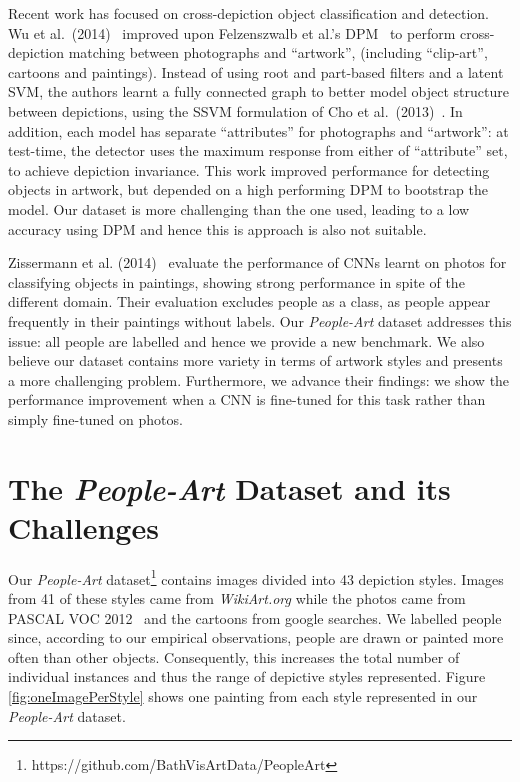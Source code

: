 \documentclass[runningheads]{llncs}
\begin{document}
Recent work has focused on cross-depiction object classification and detection.
Wu et al.\ (2014)~\cite{wu2014learning} improved upon Felzenszwalb et al.'s \ac{DPM}~\cite{felzenszwalb2010object} to perform cross-depiction matching between photographs and ``artwork'', (including ``clip-art'', cartoons and paintings).
Instead of using root and part-based filters and a latent \ac{SVM}, the authors learnt a fully connected graph to better model object structure between depictions, using the \ac{SSVM} formulation of Cho et al.\ (2013)~\cite{cho2013learning}.
In addition, each model has separate ``attributes'' for photographs and ``artwork'': at test-time, the detector uses the maximum response from either of  ``attribute'' set, to achieve depiction invariance.
This work improved performance for detecting objects in artwork, but depended on a high performing \ac{DPM} to bootstrap the model.
Our dataset is more challenging than the one used, leading to a low accuracy using \ac{DPM} and hence this is approach is also not suitable.

Zissermann et al. (2014)~\cite{crowley2014search} evaluate the performance of \acp{CNN} learnt on \acp{photo} for classifying objects in paintings, showing strong performance in spite of the different domain.
Their evaluation excludes people as a class, as people appear frequently in their paintings without labels.
Our \textit{People-Art} dataset addresses this issue: all people are labelled and hence we provide a new benchmark.
We also believe our dataset contains more variety in terms of artwork styles and presents a more challenging problem.
Furthermore, we advance their findings: we show the performance improvement when a \ac{CNN} is fine-tuned for this task rather than simply fine-tuned on \acp{photo}.

 
\section{The \textit{People-Art} Dataset and its Challenges}
\label{sec:dataset}
Our \textit{People-Art} dataset\footnote{https://github.com/BathVisArtData/PeopleArt} contains images divided into 43 depiction styles.
Images from 41 of these styles came from \textit{WikiArt.org} while the \acp{photo} came from PASCAL VOC 2012~\cite{Everingham10} and the cartoons from google searches.
We labelled people since, according to our empirical observations, people are drawn or painted more often than other objects.
Consequently, this increases the total number of individual instances and thus the range of depictive styles represented.
Figure \ref{fig:oneImagePerStyle} shows one painting from each style represented in our \textit{People-Art} dataset.
\end{document}
